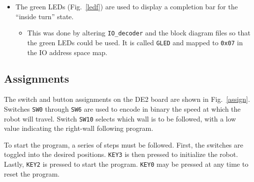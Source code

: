\begin{itemize}
\item The green LEDs (Fig.~\ref{ledf}) are used to display a
  completion bar for the ``inside turn'' state.
  \begin{itemize}
  \item This was done by altering \verb+IO_decoder+ and the block
    diagram files so that the green LEDs could be used. It is called
    \verb+GLED+ and mapped to \verb+0x07+ in the IO address space map.
  \end{itemize}
\end{itemize}
\label{leds}

\subsection{Assignments}

\begin{figure}[h!]
  \centering \cprotect {}
\end{figure}

The switch and button assignments on the DE2 board are shown in
Fig.~\ref{assign}.  Switches \verb+SW0+ through \verb+SW6+ are used to
encode in binary the speed at which the robot will travel. Switch
\verb+SW10+ selects which wall is to be followed, with a low value
indicating the right-wall following program.
 
To start the program, a series of steps must be followed. First, the
switches are toggled into the desired positions. \verb+KEY3+ is then
pressed to initialize the robot. Lastly, \verb+KEY2+ is pressed to
start the program. \verb+KEY0+ may be pressed at any time to reset
the program.


